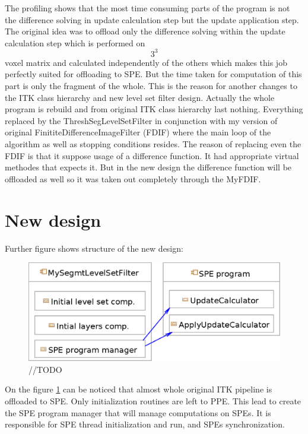 The profiling shows that the most time consuming parts of the program is not the difference solving in update calculation step but the update application step.
The original idea was to offload only the difference solving within the update calculation step which is performed on $$3^3$$ voxel matrix and calculated independently of the others which makes this job perfectly suited for offloading to SPE.
But the time taken for computation of this part is only the fragment of the whole.
This is the reason for another changes to the ITK class hierarchy and new level set filter design.
Actually the whole program is rebuild and from original ITK class hierarchy last nothing.
Everything replaced by the ThreshSegLevelSetFilter in conjunction with my version of original FinititeDifferenceImageFilter (FDIF) where the main loop of the algorithm as well as stopping conditions resides.
The reason of replacing even the FDIF is that it suppose usage of a difference function.
It had appropriate virtual methodes that expects it.
But in the new design the difference function will be offloaded as well so it was taken out completely through the MyFDIF.

\section{New design}

Further figure shows structure of the new design:

\begin{figure}
    \centering
    \includegraphics[width=15cm]{data/newDesign}
    \caption[Diagram of new design components]{//TODO}
    \label{fg:newDesign}
\end{figure}

On the figure \ref{fg:newDesign} can be noticed that almost whole original ITK pipeline is offloaded to SPE.
Only initialization routines are left to PPE. This lead to create the SPE program manager that will manage computations on SPEs.
It is responsible for SPE thread initialization and run, and SPEs synchronization.

